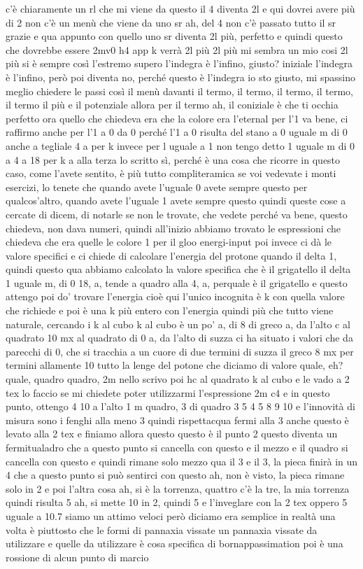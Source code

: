 \begin{soluzione}
   c'è chiaramente un rl che mi viene da questo il 4 diventa 2l e qui dovrei avere più di 2 non c'è un menù che viene da uno sr ah, del 4 non c'è passato tutto il sr grazie e qua appunto con quello uno sr diventa 2l più, perfetto e quindi questo che dovrebbe essere 2mv0 h4 app k verrà 2l più 2l più mi sembra un mio cosi 2l più si è sempre così l'estremo supero l'indegra è l'infino, giusto? iniziale l'indegra è l'infino, però poi diventa no, perché questo è l'indegra io sto giusto, mi spassino meglio chiedere le passi così il menù davanti il termo, il termo, il termo, il termo, il termo il più e il potenziale allora per il termo ah, il coniziale è che ti occhia perfetto ora quello che chiedeva era che la colore era l'eternal per l'1 va bene, ci raffirmo anche per l'1 a 0 da 0 perché l'1 a 0 risulta del stano a 0 uguale m di 0 anche a tegliale 4 a per k invece per l uguale a 1 non tengo detto 1 uguale m di 0 a 4 a 18 per k a alla terza lo scritto sì, perché è una cosa che ricorre in questo caso, come l'avete sentito, è più tutto compliteramica se voi vedevate i monti esercizi, lo tenete che quando avete l'uguale 0 avete sempre questo per qualcos'altro, quando avete l'uguale 1 avete sempre questo quindi queste cose a cercate di dicem, di notarle se non le trovate, che vedete perché va bene, questo chiedeva, non dava numeri, quindi all'inizio abbiamo trovato le espressioni che chiedeva che era quelle le colore 1 per il gloo energi-input poi invece ci dà le valore specifici e ci chiede di calcolare l'energia del protone quando il delta 1, quindi questo qua abbiamo calcolato la valore specifica che è il grigatello il delta 1 uguale m, di 0 18, a, tende a quadro alla 4, a, perquale è il grigatello e questo attengo poi do' trovare l'energia cioè qui l'unico incognita è k con quella valore che richiede e poi è una k più entero con l'energia quindi più che tutto viene naturale, cercando i k al cubo k al cubo è un po' a, di 8 di greco a, da l'alto c al quadrato 10 mx al quadrato di 0 a, da l'alto di suzza ci ha situato i valori che da parecchi di 0, che si tracchia a un cuore di due termini di suzza il greco 8 mx per termini allamente 10 tutto la lenge del potone che diciamo di valore quale, eh? quale, quadro quadro, 2m nello scrivo poi hc al quadrato k al cubo e le vado a 2 tex lo faccio se mi chiedete poter utilizzarmi l'espressione 2m c4 e in questo punto, ottengo 4 10 a l'alto 1 m quadro, 3 di quadro 3 5 4 5 8 9 10 e l'innovità di misura sono i fenghi alla meno 3 quindi rispettacqua fermi alla 3 anche questo è levato alla 2 tex e finiamo allora questo questo è il punto 2 questo diventa un fermitualadro che a questo punto si cancella con questo e il mezzo e il quadro si cancella con questo e quindi rimane solo mezzo qua il 3 e il 3, la pieca finirà in un 4 che a questo punto si può sentirci con questo ah, non è visto, la pieca rimane solo in 2 e poi l'altra cosa ah, si è la torrenza, quattro c'è la tre, la mia torrenza quindi risulta 5 ah, si mette 10 in 2, quindi 5 e l'inveglare con la 2 tex oppero 5 uguale a 10.7 siamo un attimo veloci però diciamo era semplice in realtà una volta è piuttosto che le formi di pannaxia vissate un pannaxia vissate da utilizzare e quelle da utilizzare è cosa specifica di bornappassimation poi è una rossione di alcun punto di marcio 
\end{soluzione}
